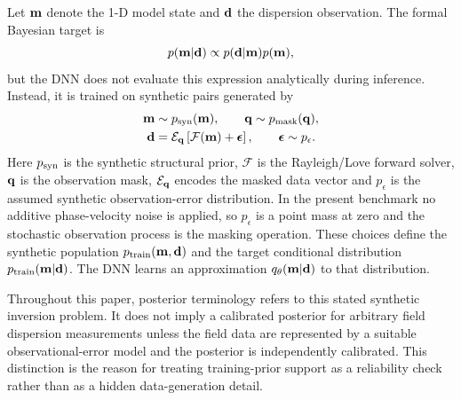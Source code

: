 \documentclass[referee]{gji}
\begin{document}
Let ${\bf m}$ denote the 1-D model state and ${\bf d}$ the dispersion observation. The formal Bayesian target is
\begin{equation}
p({\bf m}|{\bf d}) \propto p({\bf d}|{\bf m})p({\bf m}),
\label{eq:bayes}
\end{equation}
but the DNN does not evaluate this expression analytically during inference. Instead, it is trained on synthetic pairs generated by
\begin{equation}
\begin{split}
{\bf m}&\sim p_{\rm syn}({\bf m}),\qquad
{\bf q}\sim p_{\rm mask}({\bf q}),\\
{\bf d}&=\mathcal{E}_{\bf q}\left[\mathcal{F}({\bf m})+\boldsymbol{\epsilon}\right],
\qquad
\boldsymbol{\epsilon}\sim p_\epsilon .
\end{split}
\label{eq:priorpredictive}
\end{equation}
Here $p_{\rm syn}$ is the synthetic structural prior, $\mathcal{F}$ is the Rayleigh/Love forward solver, ${\bf q}$ is the observation mask, $\mathcal{E}_{\bf q}$ encodes the masked data vector and $p_\epsilon$ is the assumed synthetic observation-error distribution. In the present benchmark no additive phase-velocity noise is applied, so $p_\epsilon$ is a point mass at zero and the stochastic observation process is the masking operation. These choices define the synthetic population $p_{\rm train}({\bf m},{\bf d})$ and the target conditional distribution $p_{\rm train}({\bf m}|{\bf d})$. The DNN learns an approximation $q_\theta({\bf m}|{\bf d})$ to that distribution.

Throughout this paper, posterior terminology refers to this stated synthetic inversion problem. It does not imply a calibrated posterior for arbitrary field dispersion measurements unless the field data are represented by a suitable observational-error model and the posterior is independently calibrated. This distinction is the reason for treating training-prior support as a reliability check rather than as a hidden data-generation detail.
\end{document}
